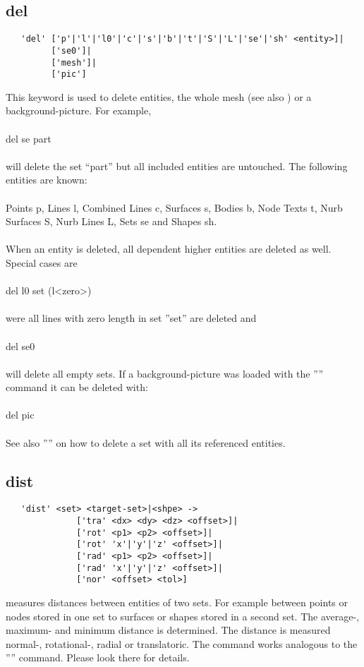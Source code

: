 \documentclass{article}
\begin{document}
\subsection{\label{del}del}
\begin{verbatim}
   'del' ['p'|'l'|'l0'|'c'|'s'|'b'|'t'|'S'|'L'|'se'|'sh' <entity>]|
         ['se0']|
         ['mesh']|
         ['pic'] 
\end{verbatim}
This keyword is used to delete entities, the whole mesh (see also ) or a background-picture. For example,\\\\
del se part\\\\
will delete the set ``part'' but all included entities are untouched. The following entities are known:\\\\
Points p, Lines l, Combined Lines c, Surfaces s, Bodies b, Node Texts t, Nurb Surfaces S, Nurb Lines L, Sets se and Shapes sh.\\\\
When an entity is deleted, all dependent higher entities are deleted as well. Special cases are\\\\del l0 set  (l<zero>)\\\\were all lines with zero length in set ''set'' are deleted and\\\\del se0\\\\will delete all empty sets.
If a background-picture was loaded with the '''' command it can be deleted with:\\\\
del pic
\\\\See also '''' on how to delete a set with all its referenced entities.

\subsection{\label{dist}dist}
\begin{verbatim}
   'dist' <set> <target-set>|<shpe> ->
              ['tra' <dx> <dy> <dz> <offset>]|
              ['rot' <p1> <p2> <offset>]|
              ['rot' 'x'|'y'|'z' <offset>]|
              ['rad' <p1> <p2> <offset>]|
              ['rad' 'x'|'y'|'z' <offset>]|
              ['nor' <offset> <tol>]   
\end{verbatim}
measures distances between entities of two sets. For example
between points or nodes stored in one set to surfaces or 
shapes stored in a second set. The average-, maximum- and 
minimum distance is determined. The distance is measured
normal-, rotational-, radial or translatoric. The command 
works analogous to the '''' command. Please look there for details.
\end{document}
